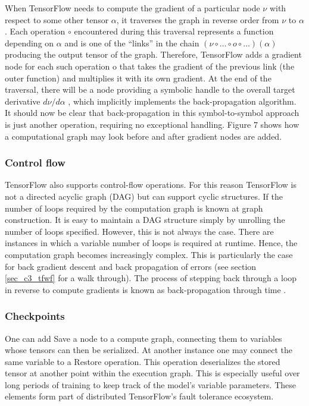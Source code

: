 When TensorFlow needs to compute the gradient of a particular node $\nu$ with respect to some other tensor $\alpha$, it traverses the graph in reverse order from $\nu$ to $\alpha$. Each operation $\circ$ encountered during this traversal represents a function depending on $\alpha$ and is one of the “links” in the chain $(\nu \circ \dots \circ o \circ \dots)(\alpha)$ producing the output tensor of the graph. Therefore, TensorFlow adds a gradient node for each such operation o that takes the gradient of the previous link (the outer function) and multiplies it with its own gradient. At the end of the traversal, there will be a node providing a symbolic handle to the overall target derivative $d\nu/d\alpha$ , which implicitly implements the back-propagation algorithm. It should now be clear that back-propagation in this symbol-to-symbol approach is just another operation, requiring no exceptional handling. Figure 7 shows how a computational graph may look before and after gradient nodes are added. 

\subsubsection{Control flow}
TensorFlow also supports control-flow operations.  For this reason TensorFlow is not a directed acyclic graph (DAG) but can support cyclic structures. If the number of loops required by the computation graph is known at graph construction.  It is easy to maintain a DAG structure simply by unrolling the number of loops specified.  However, this is not always the case.  There are instances in which a variable number of loops is required at runtime.  Hence, the computation graph becomes increasingly complex.  This is particularly the case for back gradient descent and back propagation of errors (see section \ref{sec_c3_tfwf} for a  walk through).  The process of stepping back through a loop in reverse to compute gradients is known as back-propagation through time \citep{al2016theano}.

\subsubsection{Checkpoints}
One can add Save a node to a compute graph, connecting them to variables whose tensors can then be serialized. At another instance one may connect the same variable to a Restore operation. This operation deserializes the stored tensor at another point within the execution graph. This is especially useful over long periods of training to keep track of the model’s variable parameters. These elements form part of distributed TensorFlow's fault tolerance ecosystem.

